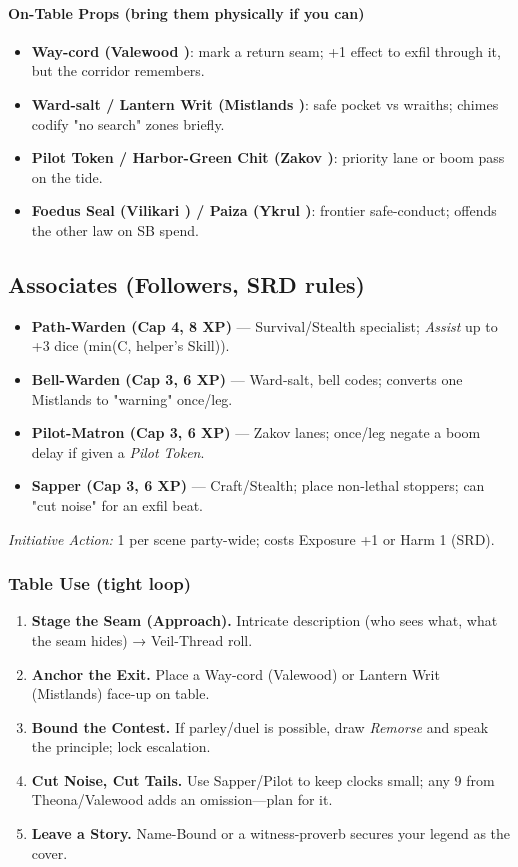 \paragraph{On-Table Props (bring them physically if you can)}
\begin{itemize}
  \item \textbf{Way-cord (Valewood \SuitDiamond{})}: mark a return seam; +1 effect to exfil through it, but the corridor remembers.
  \item \textbf{Ward-salt / Lantern Writ (Mistlands \SuitDiamond{})}: safe pocket vs wraiths; chimes codify "no search" zones briefly.
  \item \textbf{Pilot Token / Harbor-Green Chit (Zakov \SuitDiamond{})}: priority lane or boom pass on the tide.
  \item \textbf{Foedus Seal (Vilikari \SuitDiamond{}) / Paiza (Ykrul \SuitDiamond{})}: frontier safe-conduct; offends the other law on SB spend.
\end{itemize}

\subsection{Associates (Followers, SRD rules)}
\begin{itemize}
  \item \textbf{Path-Warden (Cap 4, 8 XP)} — Survival/Stealth specialist; \emph{Assist} up to +3 dice (min(C, helper's Skill)).
  \item \textbf{Bell-Warden (Cap 3, 6 XP)} — Ward-salt, bell codes; converts one Mistlands \SuitClub{} to "warning" once/leg.
  \item \textbf{Pilot-Matron (Cap 3, 6 XP)} — Zakov lanes; once/leg negate a boom delay if given a \emph{Pilot Token}.
  \item \textbf{Sapper (Cap 3, 6 XP)} — Craft/Stealth; place non-lethal stoppers; can "cut noise" for an exfil beat.
\end{itemize}
\emph{Initiative Action:} 1 per scene party-wide; costs Exposure +1 or Harm 1 (SRD).

\subsubsection{Table Use (tight loop)}
\begin{enumerate}
  \item \textbf{Stage the Seam (Approach).} Intricate description (who sees what, what the seam hides) → Veil-Thread roll.
  \item \textbf{Anchor the Exit.} Place a Way-cord (Valewood) or Lantern Writ (Mistlands) \SuitDiamond{} face-up on table.
  \item \textbf{Bound the Contest.} If parley/duel is possible, draw \emph{Remorse} and speak the principle; lock escalation.
  \item \textbf{Cut Noise, Cut Tails.} Use Sapper/Pilot to keep clocks small; any 9 from Theona/Valewood adds an omission—plan for it.
  \item \textbf{Leave a Story.} Name-Bound or a witness-proverb secures your legend as the cover.
\end{enumerate}

